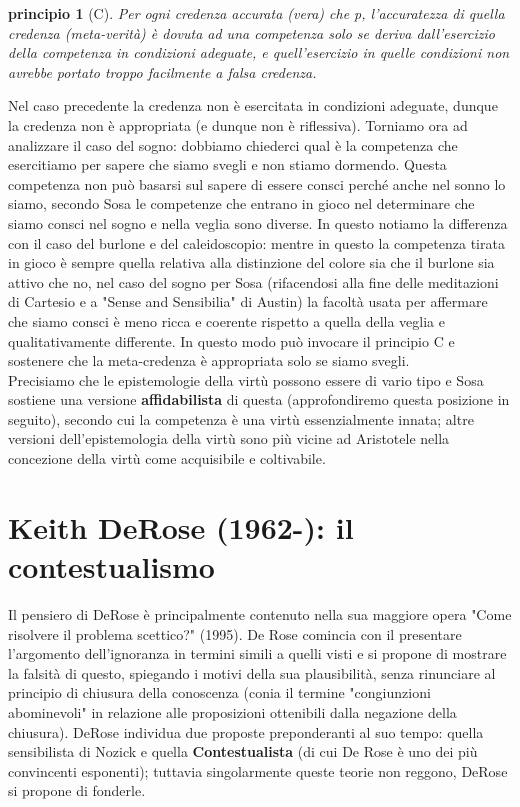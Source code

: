 \documentclass[10pt,a4paper]{article}
\newtheorem{principio}{principio}
\begin{document}
\begin{principio}[C]
	Per ogni credenza accurata (vera) che p, l'accuratezza di quella credenza (meta-verità) è dovuta ad una competenza solo se deriva dall'esercizio della competenza in condizioni adeguate, e quell'esercizio in quelle condizioni non avrebbe portato troppo facilmente a falsa credenza. 
\end{principio}
Nel caso precedente la credenza non è esercitata in condizioni adeguate, dunque la credenza non è appropriata (e dunque non è riflessiva). Torniamo ora ad analizzare il caso del sogno: dobbiamo chiederci qual è la competenza che esercitiamo per sapere che siamo svegli e non stiamo dormendo. Questa competenza non può basarsi sul sapere di essere consci perché anche nel sonno lo siamo, secondo Sosa le competenze che entrano in gioco nel determinare che siamo consci nel sogno e nella veglia sono diverse. In questo notiamo la differenza con il caso del burlone e del caleidoscopio: mentre in questo la competenza tirata in gioco è sempre quella relativa alla distinzione del colore sia che il burlone sia attivo che no, nel caso del sogno per Sosa (rifacendosi alla fine delle meditazioni di Cartesio e a "Sense and Sensibilia" di Austin) la facoltà usata per affermare che siamo consci è meno ricca e coerente rispetto a quella della veglia e qualitativamente differente. In questo modo può invocare il principio C e sostenere che la meta-credenza è appropriata solo se siamo svegli.\\
Precisiamo che le epistemologie della virtù possono essere di vario tipo e Sosa sostiene una versione \textbf{affidabilista} di questa (approfondiremo questa posizione in seguito), secondo cui la competenza è una virtù essenzialmente innata; altre versioni dell'epistemologia della virtù sono più vicine ad Aristotele nella concezione della virtù come acquisibile e coltivabile.
\newpage
\section{Keith DeRose (1962-): il contestualismo}
Il pensiero di DeRose è principalmente contenuto nella sua maggiore opera "Come risolvere il problema scettico?" (1995). De Rose comincia con il presentare l'argomento dell'ignoranza in termini simili a quelli visti e si propone di mostrare la falsità di questo, spiegando i motivi della sua plausibilità, senza rinunciare al principio di chiusura della conoscenza (conia il termine "congiunzioni abominevoli" in relazione alle proposizioni ottenibili dalla negazione della chiusura). DeRose individua due proposte preponderanti al suo tempo: quella sensibilista di Nozick e quella \textbf{Contestualista} (di cui De Rose è uno dei più convincenti esponenti); tuttavia singolarmente queste teorie non reggono, DeRose si propone di fonderle. 
\end{document}
